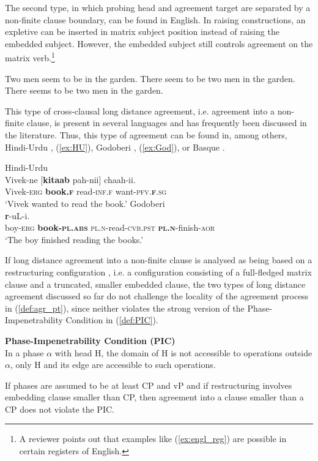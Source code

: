\documentclass[output=paper
,modfonts
,nonflat]{langsci/langscibook}
\begin{document}
The second type, in which probing head and agreement target are separated by a non-finite clause boundary, can be found in English. In raising constructions, an expletive can be inserted in matrix subject position instead of raising the embedded subject. However, the embedded subject still controls agreement on the matrix verb.\footnote{A reviewer points out that examples like (\ref{ex:engl_reg}) are possible in certain registers of English.}
\begin{exe}
\ex	
	\xlist
	\ex Two men seem to be in the garden.
	\ex There seem to be two men in the garden.
	\ex *There seems to be two men in the garden.\label{ex:engl_reg}
	\endxlist
\end{exe}
This type of cross-clausal long distance agreement, i.e. agreement into a non-finite clause, is present in several languages and has frequently been discussed in the literature. Thus, this type of agreement can be found in, among others, Hindi-Urdu \citep{Bhatt2005}, (\ref{ex:HU}), Godoberi \citep{Haspelmath1999}, (\ref{ex:God}), or Basque \citep{Preminger2009}.  
\begin{exe}
\ex
	\xlist
	\ex Hindi-Urdu \citep[][760]{Bhatt2005}\label{ex:HU}\\
		\gll Vivek-ne [\textbf{kitaab} pah-nii] chaah-ii.\\
		 Vivek-\textsc{erg} \textbf{book.\textsc{f}} read-\textsc{inf.f} want-\textsc{pfv.\textbf{f}.sg}\\
		\glt `Vivek wanted to read the book.' \hfill 
	\ex	Godoberi  \citep[][136]{Haspelmath1999}\label{ex:God}\\
		 \textbf{r}-uL-i.\\
		 boy-\textsc{erg} \textbf{book-\textsc{pl.abs}} \textsc{pl.n}-read-\textsc{cvb.pst} \textbf{\textsc{pl.n}}-finish-\textsc{aor}\\
		\glt `The boy finished reading the books.' \hfill
	\endxlist
\end{exe}
If long distance agreement into a non-finite clause is analysed as being based on a restructuring configuration \citep{Wurmbrand2001}, i.e. a configuration consisting of a full-fledged matrix clause and a truncated, smaller embedded clause, the two types of long distance agreement discussed so far do not challenge the locality of the agreement process in (\ref{def:agr_pt}), since neither violates the strong version of the Phase-Impenetrability Condition in (\ref{def:PIC}).
\begin{exe} 
	\ex \label{def:PIC} \textbf{Phase-Impenetrability Condition (PIC)} \citep{Chomsky2001}\\
	In a phase $ \alpha $ with head H, the domain of H is not accessible to operations outside $ \alpha $, only H and its edge are accessible to such operations.
\end{exe}
If phases are assumed to be at least CP and vP and if restructuring involves embedding clause smaller than CP, then agreement into a clause smaller than a CP does not violate the PIC.
\end{document}
